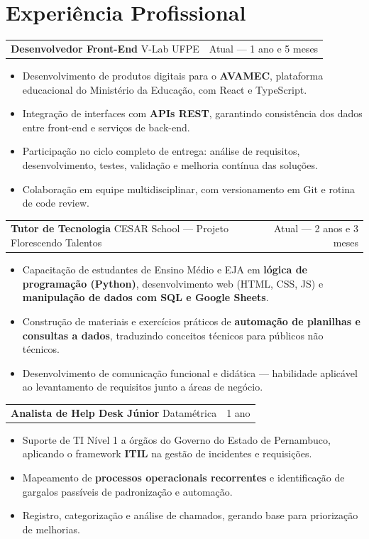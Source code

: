 \documentclass[a4paper,10.5pt]{article}
\makeatletter
\newcommand{\cargo}[3]{%
  \vspace{2pt}
  \begin{tabularx}{\textwidth}{@{}Xr@{}}
    \textbf{#1} \textnormal{\textbar{} #2} & \textcolor{muted}{#3}
  \end{tabularx}%
  \vspace{1pt}
}
\makeatother
\begin{document}
\section{Experiência Profissional}

\cargo{Desenvolvedor Front-End}{V-Lab UFPE}{Atual --- 1 ano e 5 meses}
\begin{itemize}
  \item Desenvolvimento de produtos digitais para o \textbf{AVAMEC}, plataforma educacional do Ministério da Educação, com React e TypeScript.
  \item Integração de interfaces com \textbf{APIs REST}, garantindo consistência dos dados entre front-end e serviços de back-end.
  \item Participação no ciclo completo de entrega: análise de requisitos, desenvolvimento, testes, validação e melhoria contínua das soluções.
  \item Colaboração em equipe multidisciplinar, com versionamento em Git e rotina de code review.
\end{itemize}

\cargo{Tutor de Tecnologia}{CESAR School --- Projeto Florescendo Talentos}{Atual --- 2 anos e 3 meses}
\begin{itemize}
  \item Capacitação de estudantes de Ensino Médio e EJA em \textbf{lógica de programação (Python)}, desenvolvimento web (HTML, CSS, JS) e \textbf{manipulação de dados com SQL e Google Sheets}.
  \item Construção de materiais e exercícios práticos de \textbf{automação de planilhas e consultas a dados}, traduzindo conceitos técnicos para públicos não técnicos.
  \item Desenvolvimento de comunicação funcional e didática --- habilidade aplicável ao levantamento de requisitos junto a áreas de negócio.
\end{itemize}

\cargo{Analista de Help Desk Júnior}{Datamétrica}{1 ano}
\begin{itemize}
  \item Suporte de TI Nível 1 a órgãos do Governo do Estado de Pernambuco, aplicando o framework \textbf{ITIL} na gestão de incidentes e requisições.
  \item Mapeamento de \textbf{processos operacionais recorrentes} e identificação de gargalos passíveis de padronização e automação.
  \item Registro, categorização e análise de chamados, gerando base para priorização de melhorias.
\end{itemize}
\end{document}
